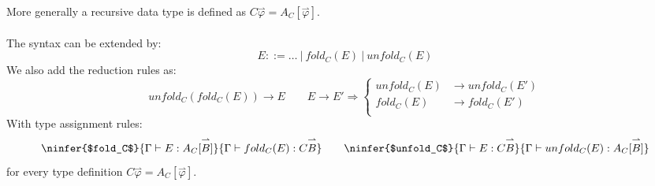 More generally a recursive data type is defined as $C \overset{\rightharpoonup}{\varphi} = A_C[\overset{\rightharpoonup}{\varphi}]$.
\\
\\ The syntax can be extended by:
\[E ::= \dots \ | \ fold_C(E) \ | \ unfold_C(E)\]
We also add the reduction rules as:
\[unfold_C(fold_C(E)) \to E \qquad E \to E' \Rightarrow \begin{cases}
		unfold_C(E) & \to unfold_C(E') \\
		fold_C(E)   & \to fold_C(E')   \\
	\end{cases}\]
With type assignment rules:
\[\ninfer{$fold_C$}{
	\Gamma \vdash E : A_C[\overset{\rightharpoonup}{B}]
	}{
	\Gamma \vdash fold_C(E) : C \overset{\rightharpoonup}{B}
	} \qquad \ninfer{$unfold_C$}{
	\Gamma \vdash E : C \overset{\rightharpoonup}{B}
	}{
	\Gamma \vdash unfold_C(E) : A_C[\overset{\rightharpoonup}{B}]
	}\]
for every type definition $C \overset{\rightharpoonup}{\varphi} = A_C[\overset{\rightharpoonup}{\varphi}]$.

